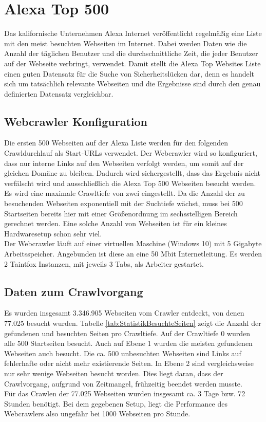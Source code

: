\section{Alexa Top 500}
\label{sec:Alexa500}
Das kalifornische Unternehmen Alexa Internet veröffentlicht regelmäßig eine Liste mit den meist besuchten Webseiten im Internet.\cite{AlexaTop500} Dabei werden Daten wie die Anzahl der täglichen Benutzer und die durchschnittliche Zeit, die jeder Benutzer auf der Webseite verbringt, verwendet. Damit stellt die Alexa Top Websites Liste einen guten Datensatz für die Suche von Sicherheitslücken dar, denn es handelt sich um tatsächlich relevante Webseiten und die Ergebnisse sind durch den genau definierten Datensatz vergleichbar.\\
\subsection{Webcrawler Konfiguration}
Die ersten 500 Webseiten auf der Alexa Liste werden für den folgenden Crawldurchlauf als Start-URLs verwendet. Der Webcrawler wird so konfiguriert, dass nur interne Links auf den Webseiten verfolgt werden, um somit auf der gleichen Domäne zu bleiben. Dadurch wird sichergestellt, dass das Ergebnis nicht verfälscht wird und ausschließlich die Alexa Top 500 Webseiten besucht werden. \\
Es wird eine maximale Crawltiefe von zwei eingestellt. Da die Anzahl der zu besuchenden Webseiten exponentiell mit der Suchtiefe wächst, muss bei 500 Startseiten bereits hier mit einer Größenordnung im sechsstelligen Bereich gerechnet werden. Eine solche Anzahl von Webseiten ist für ein kleines Hardwaresetup schon sehr viel.\\
Der Webcrawler läuft auf einer virtuellen Maschine (Windows 10) mit 5 Gigabyte Arbeitsspeicher. Angebunden ist diese an eine 50 Mbit Internetleitung. Es werden 2 Taintfox Instanzen, mit jeweils 3 Tabs, als Arbeiter gestartet.
\subsection{Daten zum Crawlvorgang}
Es wurden insgesamt 3.346.905 Webseiten vom Crawler entdeckt, von denen 77.025 besucht wurden. Tabelle \ref{tab:StatistikBesuchteSeiten} zeigt die Anzahl der gefundenen und besuchten Seiten pro Crawltiefe. Auf der Crawltiefe 0 wurden alle 500 Startseiten besucht. Auch auf Ebene 1 wurden die meisten gefundenen Webseiten auch besucht. Die ca. 500 unbesuchten Webseiten sind Links auf fehlerhafte oder nicht mehr existierende Seiten. In Ebene 2 sind vergleichsweise nur sehr wenige Webseiten besucht worden. Dies liegt daran, dass der Crawlvorgang, aufgrund von Zeitmangel, frühzeitig beendet werden musste. \\
Für das Crawlen der 77.025 Webseiten wurden insgesamt ca. 3 Tage bzw. 72 Stunden benötigt. Bei dem gegebenen Setup, liegt die Performance des Webcrawlers also ungefähr bei 1000 Webseiten pro Stunde.

